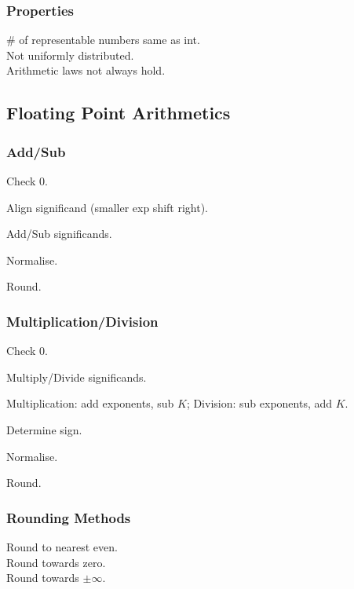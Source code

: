 \subsubsection*{Properties}
\# of representable numbers same as int.\\
Not uniformly distributed.\\
Arithmetic laws not always hold.

\subsection*{Floating Point Arithmetics}

\subsubsection*{Add/Sub}
\begin{enumerate*}[label=(\arabic*)]
    \item Check 0.
    \item Align significand (smaller exp shift right).
    \item Add/Sub significands.
    \item Normalise.
    \item Round.
\end{enumerate*}

\subsubsection*{Multiplication/Division}
\begin{enumerate*}[label=(\arabic*)]
    \item Check 0.
    \item Multiply/Divide significands.
    \item Multiplication: add exponents, sub $K$; Division: sub exponents, add $K$.
    \item Determine sign.
    \item Normalise.
    \item Round.
\end{enumerate*}

\subsubsection*{Rounding Methods}
Round to nearest even.\\
Round towards zero.\\
Round towards $\pm\infty$.
